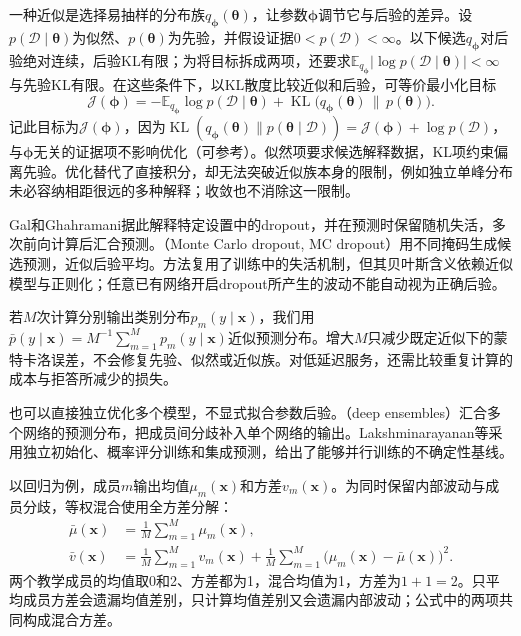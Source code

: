 一种近似是选择易抽样的分布族$q_{\bm{\phi}}(\bm{\theta})$，让参数$\bm{\phi}$调节它与后验的差异。设$p(\mathcal D\mid\bm{\theta})$为似然、$p(\bm{\theta})$为先验，并假设证据$0<p(\mathcal D)<\infty$。以下候选$q_{\bm\phi}$对后验绝对连续，后验KL有限；为将目标拆成两项，还要求$\mathbb E_{q_{\bm\phi}}|\log p(\mathcal D\mid\bm\theta)|<\infty$与先验KL有限。在这些条件下，以KL散度比较近似和后验，可等价最小化目标
\begin{equation}
 \mathcal J(\bm{\phi})
 =-\mathbb E_{q_{\bm{\phi}}}\log p(\mathcal D\mid\bm{\theta})
   +\operatorname{KL}\bigl(q_{\bm{\phi}}(\bm{\theta})
                    \,\|\,p(\bm{\theta})\bigr).
 \label{eq:reliability-variational-objective}
\end{equation}
记此目标为$\mathcal J(\bm{\phi})$，因为$\operatorname{KL}(q_{\bm{\phi}}(\bm{\theta})\|p(\bm{\theta}\mid\mathcal D))=\mathcal J(\bm{\phi})+\log p(\mathcal D)$，与$\bm{\phi}$无关的证据项不影响优化（可参考）。似然项要求候选解释数据，KL项约束偏离先验。优化替代了直接积分，却无法突破近似族本身的限制，例如独立单峰分布未必容纳相距很远的多种解释；收敛也不消除这一限制。

Gal和Ghahramani据此解释特定设置中的dropout，并在预测时保留随机失活，多次前向计算后汇合预测。（Monte Carlo dropout, MC dropout）用不同掩码生成候选预测，近似后验平均。方法复用了训练中的失活机制，但其贝叶斯含义依赖近似模型与正则化；任意已有网络开启dropout所产生的波动不能自动视为正确后验。

若$M$次计算分别输出类别分布$p_m(y\mid\bm{x})$，我们用$\bar p(y\mid\bm{x})=M^{-1}\sum_{m=1}^{M}p_m(y\mid\bm{x})$近似预测分布。增大$M$只减少既定近似下的蒙特卡洛误差，不会修复先验、似然或近似族。对低延迟服务，还需比较重复计算的成本与拒答所减少的损失。

也可以直接独立优化多个模型，不显式拟合参数后验。（deep ensembles）汇合多个网络的预测分布，把成员间分歧补入单个网络的输出。Lakshminarayanan等采用独立初始化、概率评分训练和集成预测，给出了能够并行训练的不确定性基线。

以回归为例，成员$m$输出均值$\mu_m(\bm{x})$和方差$v_m(\bm{x})$。为同时保留内部波动与成员分歧，等权混合使用全方差分解：
\begin{equation}
 \begin{aligned}
 \bar\mu(\bm{x})&=\frac1M\sum_{m=1}^{M}\mu_m(\bm{x}),\\
 \bar v(\bm{x})&=\frac1M\sum_{m=1}^{M}v_m(\bm{x})
  +\frac1M\sum_{m=1}^{M}
       \bigl(\mu_m(\bm{x})-\bar\mu(\bm{x})\bigr)^2.
 \end{aligned}
 \label{eq:reliability-ensemble-variance}
\end{equation}
两个教学成员的均值取0和2、方差都为1，混合均值为1，方差为$1+1=2$。只平均成员方差会遗漏均值差别，只计算均值差别又会遗漏内部波动；公式中的两项共同构成混合方差。


